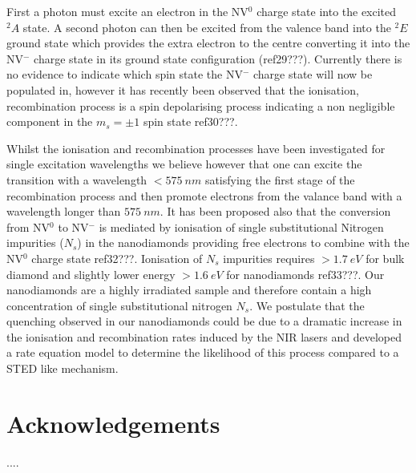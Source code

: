 \documentclass[,prl,twocolumn]{revtex4}
\begin{document}
First a photon must excite an electron in the NV$^0$ charge state into the excited $^2A$ state. A second photon can then be excited from the valence band into the $^2E$ ground state which provides the extra electron to the centre converting it into the NV$^-$ charge state in its ground state configuration (ref29???). Currently there is no evidence to indicate which spin state the NV$^-$ charge state will now be populated in, however it has recently been observed that the ionisation, recombination process is a spin depolarising process indicating a non negligible component in the $m_s=\pm1$ spin state ref30???.




Whilst the ionisation and recombination processes have been investigated for single excitation wavelengths we believe however that one can excite the transition with a wavelength $<\SI{575}{nm}$ satisfying the first stage of the recombination process and then promote electrons from the valance band with a wavelength longer than $\SI{575}{nm}$. It has been proposed also that the conversion from NV$^0$ to NV$^-$ is mediated by ionisation of single substitutional Nitrogen impurities ($N_s$) in the nanodiamonds providing free electrons to combine with the NV$^0$ charge state ref32???. Ionisation of $N_s$ impurities requires $>\SI{1.7}{eV}$ for bulk diamond and slightly lower energy $>\SI{1.6}{eV}$ for nanodiamonds ref33???. Our nanodiamonds are a highly irradiated sample and therefore contain a high concentration of single substitutional nitrogen $N_s$. We postulate that the quenching observed in our nanodiamonds could be due to a dramatic increase in the ionisation and recombination rates induced by the NIR lasers and developed a rate equation model to determine the likelihood of this process compared to a STED like mechanism.




\section*{Acknowledgements}

....

%
%
%




\begin{thebibliography}{27}






\end{thebibliography}
\end{document}
